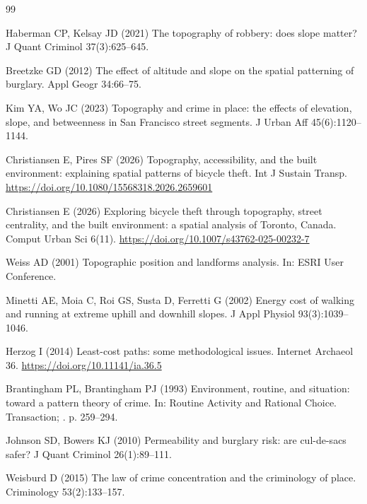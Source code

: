 \documentclass[12pt,letterpaper]{article}
\begin{document}
\begin{thebibliography}{99}

Haberman CP, Kelsay JD (2021) The topography of robbery: does slope matter? J Quant Criminol 37(3):625--645.

Breetzke GD (2012) The effect of altitude and slope on the spatial patterning of burglary. Appl Geogr 34:66--75.

Kim YA, Wo JC (2023) Topography and crime in place: the effects of elevation, slope, and betweenness in San Francisco street segments. J Urban Aff 45(6):1120--1144.

Christiansen E, Pires SF (2026) Topography, accessibility, and the built environment: explaining spatial patterns of bicycle theft. Int J Sustain Transp. \url{https://doi.org/10.1080/15568318.2026.2659601}

Christiansen E (2026) Exploring bicycle theft through topography, street centrality, and the built environment: a spatial analysis of Toronto, Canada. Comput Urban Sci 6(11). \url{https://doi.org/10.1007/s43762-025-00232-7}

Weiss AD (2001) Topographic position and landforms analysis. In: ESRI User Conference.

Minetti AE, Moia C, Roi GS, Susta D, Ferretti G (2002) Energy cost of walking and running at extreme uphill and downhill slopes. J Appl Physiol 93(3):1039--1046.

Herzog I (2014) Least-cost paths: some methodological issues. Internet Archaeol 36. \url{https://doi.org/10.11141/ia.36.5}

Brantingham PL, Brantingham PJ (1993) Environment, routine, and situation: toward a pattern theory of crime. In: Routine Activity and Rational Choice. Transaction; . p. 259--294.

Johnson SD, Bowers KJ (2010) Permeability and burglary risk: are cul-de-sacs safer? J Quant Criminol 26(1):89--111.

Weisburd D (2015) The law of crime concentration and the criminology of place. Criminology 53(2):133--157.


\end{thebibliography}
\end{document}
